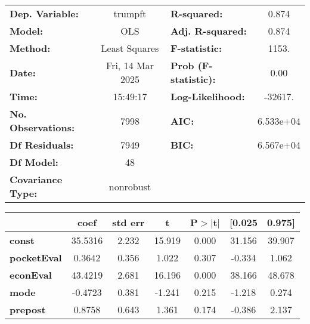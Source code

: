 \begin{center}
\begin{tabular}{lclc}
\toprule
\textbf{Dep. Variable:}         &     trumpft      & \textbf{  R-squared:         } &     0.874   \\
\textbf{Model:}                 &       OLS        & \textbf{  Adj. R-squared:    } &     0.874   \\
\textbf{Method:}                &  Least Squares   & \textbf{  F-statistic:       } &     1153.   \\
\textbf{Date:}                  & Fri, 14 Mar 2025 & \textbf{  Prob (F-statistic):} &     0.00    \\
\textbf{Time:}                  &     15:49:17     & \textbf{  Log-Likelihood:    } &   -32617.   \\
\textbf{No. Observations:}      &        7998      & \textbf{  AIC:               } & 6.533e+04   \\
\textbf{Df Residuals:}          &        7949      & \textbf{  BIC:               } & 6.567e+04   \\
\textbf{Df Model:}              &          48      & \textbf{                     } &             \\
\textbf{Covariance Type:}       &    nonrobust     & \textbf{                     } &             \\
\bottomrule
\end{tabular}
\begin{tabular}{lcccccc}
                                & \textbf{coef} & \textbf{std err} & \textbf{t} & \textbf{P$> |$t$|$} & \textbf{[0.025} & \textbf{0.975]}  \\
\midrule
\textbf{const}                  &      35.5316  &        2.232     &    15.919  &         0.000        &       31.156    &       39.907     \\
\textbf{pocketEval}             &       0.3642  &        0.356     &     1.022  &         0.307        &       -0.334    &        1.062     \\
\textbf{econEval}               &      43.4219  &        2.681     &    16.196  &         0.000        &       38.166    &       48.678     \\
\textbf{mode}                   &      -0.4723  &        0.381     &    -1.241  &         0.215        &       -1.218    &        0.274     \\
\textbf{prepost}                &       0.8758  &        0.643     &     1.361  &         0.174        &       -0.386    &        2.137     \\

\end{tabular}
\end{center}

